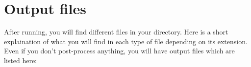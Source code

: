 \section{Output files} \label{post}
After running, you will find different files in your directory. Here is a short explaination of what you will find in each type of file depending on its extension.\\



Even if you don't post-process anything, you will have output files which are listed here:

